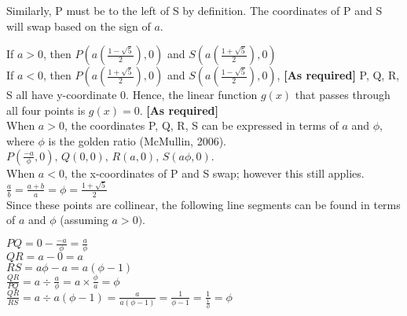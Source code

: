 \documentclass{homework}
\begin{document}
\begin{flushleft}
\begin{paracol}{2}
    Similarly, P must be to the left of S by definition. The coordinates of P and S will swap based on the sign of $a$. \vspace{1em}\\
\end{paracol}
    If $a>0$, then $P(a(\frac{1 - \sqrt{5}}{2}),0)$ and $S(a(\frac{1 + \sqrt{5}}{2}),0)$ \\
    If $a<0$, then $P(a(\frac{1 + \sqrt{5}}{2}),0)$ and $S(a(\frac{1 - \sqrt{5}}{2}),0)$, \hspace{2.4em} \textbf{[As required]} \newpage
    P, Q, R, S all have y-coordinate 0. Hence, the linear function $g(x)$ that passes through all four points is $g(x)=0$. \hspace{34.3em}
        \textbf{[As required]} \vspace{1em} \\
    When $a>0$, the coordinates P, Q, R, S can be expressed in terms of $a$ and $\phi$, where $\phi$ is the golden ratio (McMullin, 2006). $P(\frac{-a}{\phi},0), \, Q(0,0), \, R(a,0), \, S(a\phi,0).$ \vspace{0.5em}\\ 
    When $a<0$, the x-coordinates of P and S swap; however this still applies. \vspace{0.8em}\\
    \hspace{3em}$\frac{a}{b}=\frac{a+b}{a}=\phi=\frac{1+\sqrt{5}}{2}$ \vspace{1em}\\ 
    Since these points are collinear, the following line segments can be found in terms of $a$ and $\phi$ (assuming $a>0)$. \vspace{0.5em}\\
\begin{paracol}{2}
    $PQ=0-\frac{-a}{\phi}=\frac{a}{\phi}$\vspace{0.5em}\\
    $QR=a-0=a$ \vspace{0.5em}\\
    $RS=a\phi-a=a(\phi-1)$ \vspace{0.5em}\\
\switchcolumn
    $\frac{QR}{PQ}=a\div \frac{a}{\phi}=a\times \frac{\phi}{a}=\phi$\vspace{0.5em}\\
    $\frac{QR}{RS}=a\div a(\phi-1)=\frac{a}{a(\phi-1)}=\frac{1}{\phi-1}=\frac{1}{\frac{1}{\phi}}=\phi$ \vspace{2em} \\
\end{paracol}

\end{flushleft}
\end{document}
